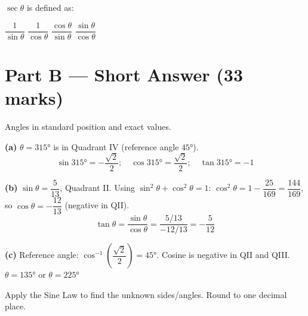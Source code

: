 \documentclass[addpoints]{exam}
\begin{document}
\begin{questions}
\question[1] $\sec\theta$ is defined as:
\begin{choices}
    \choice $\dfrac{1}{\sin\theta}$
    \correctchoice $\dfrac{1}{\cos\theta}$
    \choice $\dfrac{\cos\theta}{\sin\theta}$
    \choice $\dfrac{\sin\theta}{\cos\theta}$
\end{choices}


\section*{Part B --- Short Answer (33 marks)}

\question Angles in standard position and exact values.
\begin{solution}[10cm]
\textbf{(a)} $\theta = \ang{315}$ is in Quadrant IV (reference angle $\ang{45}$).
\[
\sin\ang{315} = -\frac{\sqrt{2}}{2};\quad \cos\ang{315} = \frac{\sqrt{2}}{2};\quad
\tan\ang{315} = -1
\]

\textbf{(b)} $\sin\theta = \dfrac{5}{13}$, Quadrant II.
Using $\sin^2\theta + \cos^2\theta = 1$:
$\cos^2\theta = 1 - \dfrac{25}{169} = \dfrac{144}{169}$, so $\cos\theta = -\dfrac{12}{13}$
(negative in QII).
\[
\tan\theta = \frac{\sin\theta}{\cos\theta} = \frac{5/13}{-12/13} = -\frac{5}{12}
\]

\textbf{(c)} Reference angle: $\cos^{-1}\!\left(\dfrac{\sqrt{2}}{2}\right) = \ang{45}$.
Cosine is negative in QII and QIII.
$\theta = \ang{135}$ or $\theta = \ang{225}$
\end{solution}

\question Apply the Sine Law to find the unknown sides/angles. Round to one decimal place.
\begin{parts}

\end{parts}
\end{questions}
\end{document}
